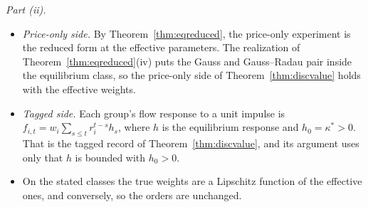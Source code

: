 \documentclass[12pt]{article}
\theoremstyle{definition}
\theoremstyle{remark}
\begin{document}
\emph{Part (ii).}
\begin{itemize}[itemsep=1pt,topsep=2pt]
\item \emph{Price-only side.} By Theorem~\ref{thm:eqreduced}, the price-only experiment is the reduced form at the effective parameters. The realization of Theorem~\ref{thm:eqreduced}(iv) puts the Gauss and Gauss--Radau pair inside the equilibrium class, so the price-only side of Theorem~\ref{thm:discvalue} holds with the effective weights.
\item \emph{Tagged side.} Each group's flow response to a unit impulse is $f_{i,t}=w_i\sum_{s\le t}r_i^{t-s}h_s$, where $h$ is the equilibrium response and $h_0=\kappa^*>0$. That is the tagged record of Theorem~\ref{thm:discvalue}, and its argument uses only that $h$ is bounded with $h_0>0$.
\item On the stated classes the true weights are a Lipschitz function of the effective ones, and conversely, so the orders are unchanged.
\end{itemize}
\end{document}
